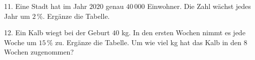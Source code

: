 \documentclass[11pt]{article}
\begin{document}
\begin{pfaufg}{}{11.}{}
Eine Stadt hat im Jahr $2020$ genau $40\,000$ Einwohner. Die Zahl wächst jedes Jahr um $2\,\%$. Ergänze die Tabelle. \newline{}
\end{pfaufg}

\begin{pfaufg}{}{12.}{}
Ein Kalb wiegt bei der Geburt $40$ kg. In den ersten Wochen nimmt es jede Woche um $15\,\%$ zu. Ergänze die Tabelle. Um wie viel kg hat das Kalb in den $8$ Wochen zugenommen? \newline{}
\end{pfaufg}
\end{document}
